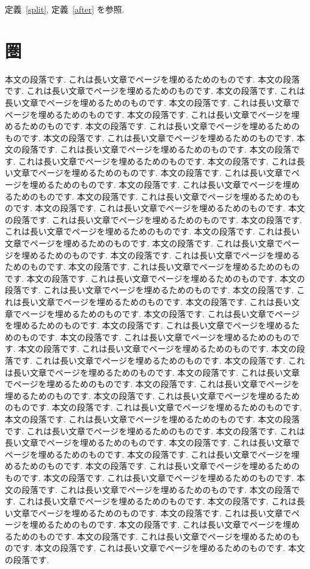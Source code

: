\documentclass{jlreq}
\begin{document}
定義~\ref{split}, 定義~\ref{after} を参照.
\section{圏}
本文の段落です. これは長い文章でページを埋めるためのものです. 本文の段落です. これは長い文章でページを埋めるためのものです. 本文の段落です. これは長い文章でページを埋めるためのものです. 本文の段落です. これは長い文章でページを埋めるためのものです. 本文の段落です. これは長い文章でページを埋めるためのものです. 本文の段落です. これは長い文章でページを埋めるためのものです. 本文の段落です. これは長い文章でページを埋めるためのものです. 本文の段落です. これは長い文章でページを埋めるためのものです. 本文の段落です. これは長い文章でページを埋めるためのものです. 本文の段落です. これは長い文章でページを埋めるためのものです. 本文の段落です. これは長い文章でページを埋めるためのものです. 本文の段落です. これは長い文章でページを埋めるためのものです. 本文の段落です. これは長い文章でページを埋めるためのものです. 本文の段落です. これは長い文章でページを埋めるためのものです. 本文の段落です. これは長い文章でページを埋めるためのものです. 本文の段落です. これは長い文章でページを埋めるためのものです. 本文の段落です. これは長い文章でページを埋めるためのものです. 本文の段落です. これは長い文章でページを埋めるためのものです. 本文の段落です. これは長い文章でページを埋めるためのものです. 本文の段落です. これは長い文章でページを埋めるためのものです. 本文の段落です. これは長い文章でページを埋めるためのものです. 本文の段落です. これは長い文章でページを埋めるためのものです. 本文の段落です. これは長い文章でページを埋めるためのものです. 本文の段落です. これは長い文章でページを埋めるためのものです. 本文の段落です. これは長い文章でページを埋めるためのものです. 本文の段落です. これは長い文章でページを埋めるためのものです. 本文の段落です. これは長い文章でページを埋めるためのものです. 本文の段落です. これは長い文章でページを埋めるためのものです. 本文の段落です. これは長い文章でページを埋めるためのものです. 本文の段落です. これは長い文章でページを埋めるためのものです. 本文の段落です. これは長い文章でページを埋めるためのものです. 本文の段落です. これは長い文章でページを埋めるためのものです. 本文の段落です. これは長い文章でページを埋めるためのものです. 本文の段落です. これは長い文章でページを埋めるためのものです. 本文の段落です. これは長い文章でページを埋めるためのものです. 本文の段落です. これは長い文章でページを埋めるためのものです. 本文の段落です. これは長い文章でページを埋めるためのものです. 本文の段落です. これは長い文章でページを埋めるためのものです. 本文の段落です. これは長い文章でページを埋めるためのものです. 本文の段落です. これは長い文章でページを埋めるためのものです. 本文の段落です. これは長い文章でページを埋めるためのものです. 本文の段落です. これは長い文章でページを埋めるためのものです. 本文の段落です. これは長い文章でページを埋めるためのものです. 本文の段落です. これは長い文章でページを埋めるためのものです. 本文の段落です. これは長い文章でページを埋めるためのものです. 本文の段落です. これは長い文章でページを埋めるためのものです. 本文の段落です. これは長い文章でページを埋めるためのものです. 本文の段落です. これは長い文章でページを埋めるためのものです. 本文の段落です. 
\end{document}
